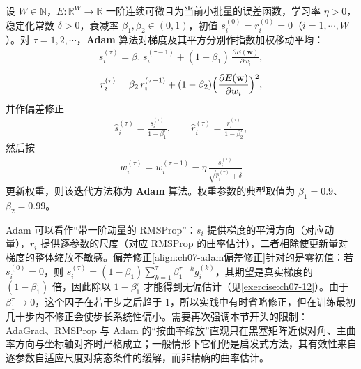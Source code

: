 \documentclass[../../main.tex]{subfiles}
\begin{document}
\begin{definition}[Adam]\label{definition:ch07-Adam}
设 $W\in\mathbb{N}$，$E:\mathbb{R}^{W}\to\mathbb{R}$ 一阶连续可微且为当前小批量的误差函数，学习率 $\eta>0$，稳定化常数 $\delta>0$，衰减率 $\beta_{1},\beta_{2}\in(0,1)$，初值 $s_{i}^{(0)}=r_{i}^{(0)}=0$（$i=1,\cdots,W$）。对 $\tau=1,2,\cdots$，\textbf{Adam} 算法对梯度及其平方分别作指数加权移动平均：
\begin{align}
s_i^{(\tau)} = \beta_1\,s_i^{(\tau-1)}+(1-\beta_1)\,\frac{\partial E(\mathbf{w})}{\partial w_i},
\label{align:ch07-adam一阶矩}
\end{align}
\begin{align}
r_i^{(\tau)} = \beta_2\,r_i^{(\tau-1)}+(1-\beta_2)\Bigl(\frac{\partial E(\mathbf{w})}{\partial w_i}\Bigr)^{2},
\label{align:ch07-adam二阶矩}
\end{align}
并作偏差修正
\begin{align}
\hat{s}_i^{(\tau)} = \frac{s_i^{(\tau)}}{1-\beta_1^{\tau}},\qquad
\hat{r}_i^{(\tau)} = \frac{r_i^{(\tau)}}{1-\beta_2^{\tau}},
\label{align:ch07-adam偏差修正}
\end{align}
然后按
\begin{align}
w_i^{(\tau)} = w_i^{(\tau-1)}-\eta\,\frac{\hat{s}_i^{(\tau)}}{\sqrt{\hat{r}_i^{(\tau)}}+\delta}
\label{align:ch07-adam更新}
\end{align}
更新权重，则该迭代方法称为 \textbf{Adam} 算法。权重参数的典型取值为 $\beta_1=0.9$、$\beta_2=0.99$。
\end{definition}

\begin{remark}
Adam 可以看作“带一阶动量的 RMSProp”：$s_i$ 提供梯度的平滑方向（对应动量），$r_i$ 提供逐参数的尺度（对应 RMSProp 的曲率估计），二者相除使更新量对梯度的整体缩放不敏感。偏差修正\eqref{align:ch07-adam偏差修正}针对的是零初值：若 $s_i^{(0)}=0$，则 $s_i^{(\tau)}=(1-\beta_1)\sum_{k=1}^{\tau}\beta_1^{\tau-k}g_i^{(k)}$，其期望是真实梯度的 $(1-\beta_1^{\tau})$ 倍，因此除以 $1-\beta_1^{\tau}$ 才能得到无偏估计（见\cref{exercise:ch07-12}）。由于 $\beta_1^{\tau}\to0$，这个因子在若干步之后趋于 $1$，所以实践中有时省略修正，但在训练最初几十步内不修正会使步长系统性偏小。需要再次强调本节开头的限制：AdaGrad、RMSProp 与 Adam 的“按曲率缩放”直观只在黑塞矩阵近似对角、主曲率方向与坐标轴对齐时严格成立；一般情形下它们仍是启发式方法，其有效性来自逐参数自适应尺度对病态条件的缓解，而非精确的曲率估计。
\end{remark}
\end{document}
